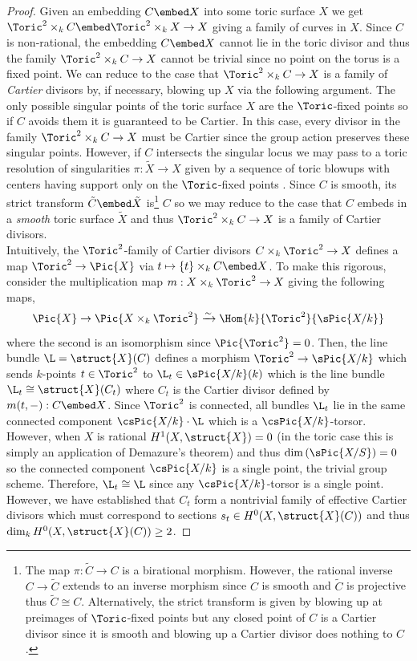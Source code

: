 \begin{proof}
Given an embedding $C \embed X$ into some toric surface $X$ we get $\Toric^2 \times_k C \embed \Toric^2  \times_k X \to X$ giving a family of curves in $X$. Since $C$ is non-rational, the embedding $C \embed X$ cannot lie in the toric divisor and thus the family $\Toric^2 \times_k C \to X$ cannot be trivial since no point on the torus is a fixed point. We can reduce to the case that $\Toric^2 \times_k C \to X$ is a family of \textit{Cartier} divisors by, if necessary, blowing up $X$ via the following argument. The only possible singular points of the toric surface $X$ are the $\Toric$-fixed points so if $C$ avoids them it is guaranteed to be Cartier. In this case, every divisor in the family $\Toric^2 \times_k C \to X$ must be Cartier since the group action preserves these singular points. However, if $C$ intersects the singular locus we may pass to a toric resolution of singularities $\pi : \tilde{X} \to X$ given by a sequence of toric blowups with centers having support only on the $\Toric$-fixed points \cite[Thm. 11.1.9]{cox}. Since $C$ is smooth, its strict transform $\tilde{C} \embed \tilde{X}$ is\footnote{The map $\pi : \tilde{C} \to C$ is a birational morphism. However, the rational inverse $C \to \tilde{C}$ extends to an inverse morphism since $C$ is smooth and $\tilde{C}$ is projective thus $\tilde{C} \cong C$. Alternatively, the strict transform is given by blowing up at preimages of $\Toric$-fixed points but any closed point of $C$ is a Cartier divisor since it is smooth and blowing up a Cartier divisor does nothing to $C$.}   $C$ so we may reduce to the case that $C$ embeds in a \textit{smooth} toric surface $\tilde{X}$ and thus $\Toric^2 \times_k C \to X$ is a family of Cartier divisors.
\bigskip\\
Intuitively, the $\Toric^2$-family of Cartier divisors $C \times_k \Toric^2 \to X$ defines a map $\Toric^2 \to \Pic{X}$ via $t \mapsto \{ t \} \times_k C \embed X$. To make this rigorous, consider the multiplication map $m : X \times_k \Toric^2 \to X$ giving the following maps,
\[ \Pic{X} \to \Pic{X \times_k \Toric^2} \xrightarrow{\sim} \Hom{k}{\Toric^2}{\sPic{X/k}} \]
where the second is an isomorphism since $\Pic{\Toric^2} = 0$. Then, the line bundle $\L = \struct{X}(C)$ defines a morphism $\Toric^2 \to \sPic{X/k}$ which sends $k$-points $t \in \Toric^2$ to $\L_t \in \sPic{X/k}(k)$ which is the line bundle $\L_t \cong \struct{X}(C_t)$ where $C_t$ is the Cartier divisor defined by $m(t,-) :  C \embed X$. Since $\Toric^2$ is connected, all bundles $\L_t$ lie in the same connected component $\csPic{X/k} \cdot \L$ which is a $\csPic{X/k}$-torsor. However, when $X$ is rational $H^1(X, \struct{X}) = 0$ (in the toric case this is simply an application of Demazure's theorem) and thus $\dim{(\sPic{X/S})} = 0$ so the connected component $\csPic{X/k}$ is a single point, the trivial group scheme. Therefore, $\L_t \cong \L$ since any $\csPic{X/k}$-torsor is a single point. However, we have established that $C_t$ form a nontrivial family of effective Cartier divisors which must correspond to sections $s_t \in H^0(X, \struct{X}(C))$ and thus $\dim_k H^0(X, \struct{X}(C)) \ge 2$.

\end{proof}
